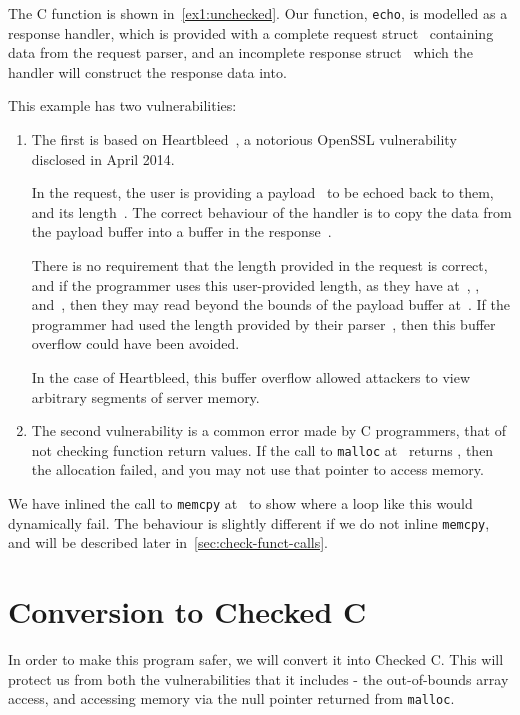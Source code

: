 The C function is shown in~\autoref{ex1:unchecked}. Our function,
\lstinline|echo|, is modelled as a response handler, which is provided
with a complete request struct~ containing data from
the request parser, and an incomplete response
struct~ which the handler will construct the response
data into.

This example has two vulnerabilities:
\begin{enumerate}
\item The first is based on Heartbleed~\cite{Heartbleed2014}, a
notorious OpenSSL vulnerability disclosed in April 2014.

In the request, the user is providing a payload~ to be
echoed back to them, and its length~. The correct
behaviour of the handler is to copy the data from the payload buffer
into a buffer in the response~.

There is no requirement that the length provided in the request is
correct, and if the programmer uses this user-provided length, as they
have at~, ,
and~, then they may read beyond the bounds of the
payload buffer at~. If the programmer had used
the length provided by their parser~, then this
buffer overflow could have been avoided.

In the case of Heartbleed, this buffer overflow allowed attackers to
view arbitrary segments of server memory.

\item The second vulnerability is a common error made by C
programmers, that of not checking function return values. If the call
to \lstinline|malloc| at~ returns \NULL, then the
allocation failed, and you may not use that pointer to access memory.

\end{enumerate}

We have inlined the call to \lstinline|memcpy| at~
to show where a loop like this would dynamically fail. The behaviour
is slightly different if we do not inline \lstinline|memcpy|, and will
be described later in~\autoref{sec:check-funct-calls}.

\section{Conversion to Checked C}

In order to make this program safer, we will convert it into Checked
C. This will protect us from both the vulnerabilities that it includes
- the out-of-bounds array access, and accessing memory via the null
pointer returned from \lstinline|malloc|.

